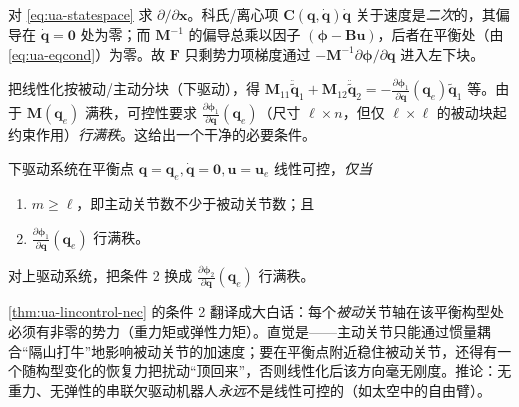 \begin{derivation}
对 \cref{eq:ua-statespace} 求 $\partial/\partial\mathbf{x}$。科氏/离心项 $\mathbf{C}(\mathbf{q},\dot{\mathbf{q}})\dot{\mathbf{q}}$ 关于速度是\emph{二次}的，其偏导在 $\dot{\mathbf{q}}=\mathbf{0}$ 处为零；而 $\mathbf{M}^{-1}$ 的偏导总乘以因子 $(\boldsymbol{\phi}-\mathbf{B}\mathbf{u})$，后者在平衡处（由 \cref{eq:ua-eqcond}）为零。故 $\mathbf{F}$ 只剩势力项梯度通过 $-\mathbf{M}^{-1}\partial\boldsymbol{\phi}/\partial\mathbf{q}$ 进入左下块。
\end{derivation}

把线性化按被动/主动分块（下驱动），得 $\mathbf{M}_{11}\ddot{\tilde{\mathbf{q}}}_1+\mathbf{M}_{12}\ddot{\tilde{\mathbf{q}}}_2=-\tfrac{\partial\boldsymbol{\phi}_1}{\partial\mathbf{q}}(\mathbf{q}_e)\tilde{\mathbf{q}}_1$ 等。由于 $\mathbf{M}(\mathbf{q}_e)$ 满秩，可控性要求 $\tfrac{\partial\boldsymbol{\phi}_1}{\partial\mathbf{q}}(\mathbf{q}_e)$（尺寸 $\ell\times n$，但仅 $\ell\times\ell$ 的被动块起约束作用）\emph{行满秩}。这给出一个干净的必要条件。

\begin{theorem}[线性可控性的必要条件]\label{thm:ua-lincontrol-nec}
下驱动系统在平衡点 $\mathbf{q}=\mathbf{q}_e,\dot{\mathbf{q}}=\mathbf{0},\mathbf{u}=\mathbf{u}_e$ 线性可控，\emph{仅当}
\begin{enumerate}
  \item $m\ge\ell$，即主动关节数不少于被动关节数；且
  \item $\tfrac{\partial\boldsymbol{\phi}_1}{\partial\mathbf{q}}(\mathbf{q}_e)$ 行满秩。
\end{enumerate}
对上驱动系统，把条件 2 换成 $\tfrac{\partial\boldsymbol{\phi}_2}{\partial\mathbf{q}}(\mathbf{q}_e)$ 行满秩。
\end{theorem}

\begin{insight}
\cref{thm:ua-lincontrol-nec} 的条件 2 翻译成大白话：每个\emph{被动}关节轴在该平衡构型处必须有非零的势力（重力矩或弹性力矩）。直觉是——主动关节只能通过惯量耦合“隔山打牛”地影响被动关节的加速度；要在平衡点附近稳住被动关节，还得有一个随构型变化的恢复力把扰动“顶回来”，否则线性化后该方向毫无刚度。推论：无重力、无弹性的串联欠驱动机器人\emph{永远}不是线性可控的（如太空中的自由臂）。
\end{insight}

